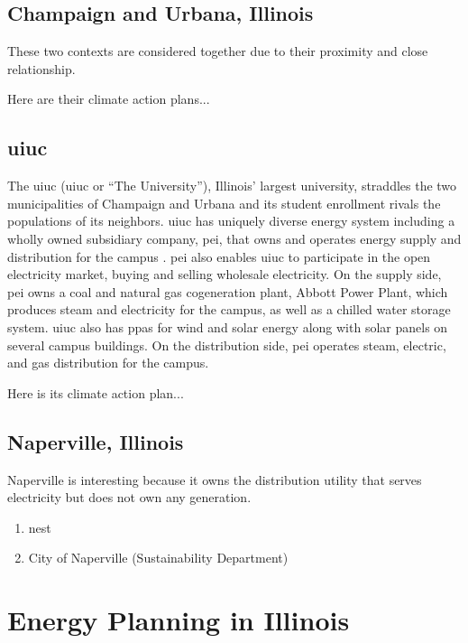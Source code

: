 \subsection{Champaign and Urbana, Illinois}
These two contexts are considered together due to their proximity and close
relationship. 

Here are their climate action plans...

\subsection{\acf{uiuc}} 

The \acl{uiuc} (\acs{uiuc} or ``The University''), Illinois' largest
university, straddles the two municipalities of Champaign and Urbana and its
student enrollment rivals the populations of its neighbors. \ac{uiuc} has
uniquely diverse energy system including a wholly owned subsidiary company,
\ac{pei}, that owns and operates energy supply and distribution for the campus
\cite{affiliated_engineers_inc_utilities_2015}. \ac{pei} also enables \ac{uiuc}
to participate in the open electricity market, buying and selling wholesale electricity.
On the supply side, \ac{pei} owns a coal and natural gas cogeneration plant, Abbott Power Plant, which
produces steam and electricity for the campus, as well as a chilled water
storage system. \ac{uiuc} also has \acp{ppa} for wind
\cite{breitweiser_wind_2016} and solar energy \cite{white_solar_2017,
white_solar_2020} along with solar panels on several campus buildings. 
On the distribution side, \ac{pei} operates steam, electric, and
gas distribution for the campus. 

Here is its climate action plan...

\subsection{Naperville, Illinois}
Naperville is interesting because it owns the distribution utility that serves
electricity but does not own any generation.
\begin{enumerate}
    \item \ac{nest}
    \item City of Naperville (Sustainability Department)
\end{enumerate}

\section{Energy Planning in Illinois}

